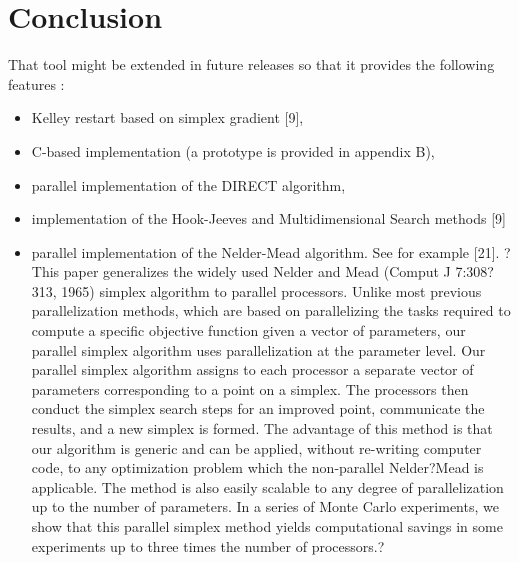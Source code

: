 %

\chapter{Conclusion}

That tool might be extended in future releases so that it provides the following features :
\begin{itemize}
\item Kelley restart based on simplex gradient [9],
\item C-based implementation (a prototype is provided in appendix B),
\item parallel implementation of the DIRECT algorithm,
\item implementation of the Hook-Jeeves and Multidimensional Search methods [9]
\item parallel implementation of the Nelder-Mead algorithm. See for example [21]. 
?This paper generalizes the widely used Nelder and Mead (Comput J 
7:308?313, 1965) simplex algorithm to parallel processors. Unlike most 
previous parallelization methods, which are based on parallelizing the 
tasks required to compute a specific objective function given a vector 
of parameters, our parallel simplex algorithm uses parallelization at 
the parameter level. Our parallel simplex algorithm assigns to each 
processor a separate vector of parameters corresponding to a point on a 
simplex. The processors then conduct the simplex search steps for an 
improved point, communicate the results, and a new simplex is formed. 
The advantage of this method is that our algorithm is generic and can be 
applied, without re-writing computer code, to any optimization problem 
which the non-parallel Nelder?Mead is applicable. The method is also 
easily scalable to any degree of parallelization up to the number of 
parameters. In a series of Monte Carlo experiments, we show that this 
parallel simplex method yields computational savings in some experiments 
up to three times the number of processors.?
\end{itemize}

